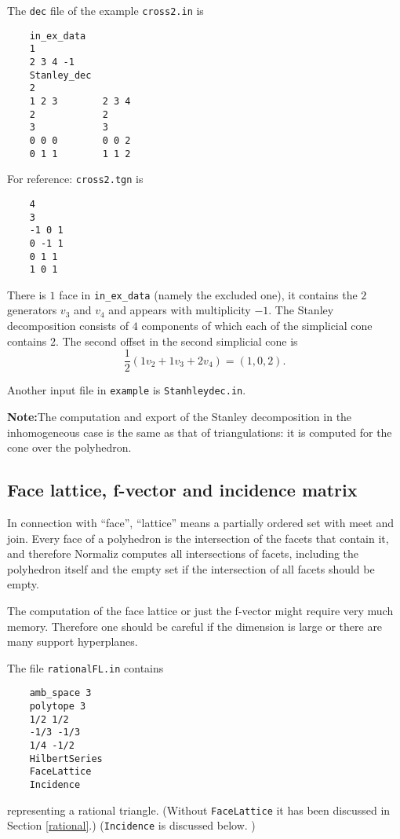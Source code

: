 \documentclass[12pt,a4paper]{scrartcl}
\theoremstyle{definition}
\begin{document}
{	
	The \verb|dec| file of the example \verb|cross2.in| is
	\begin{Verbatim}
	in_ex_data
	1
	2 3 4 -1
	Stanley_dec
	2
	1 2 3        2 3 4 
	2            2
	3            3
	0 0 0        0 0 2 
	0 1 1        1 1 2 
	\end{Verbatim}
	For reference: \verb|cross2.tgn| is
	\begin{Verbatim}
	4
	3
	-1 0 1 
	0 -1 1 
	0 1 1 
	1 0 1 
	\end{Verbatim}
	
	There is $1$ face in \verb|in_ex_data| (namely the excluded one), it contains the $2$ generators $v_3$ and $v_4$  and appears with multiplicity $-1$. The Stanley decomposition consists of $4$ components of which each of the simplicial cone contains $2$. The second offset in the second simplicial cone is
	$$
	\frac12 (1v_2+1v_3+2v_4)=(1,0,2).
	$$ 
	
	Another input file in \verb|example| is \verb|Stanhleydec.in|.
	
	\textbf{Note:}\enspace The computation and export of the Stanley decomposition in the inhomogeneous case is the same as that of triangulations: it is computed for the cone over the polyhedron.
	
	\subsection{Face lattice, f-vector and incidence matrix}\label{FaceLattice}
	
	In connection with ``face'', ``lattice'' means a partially ordered set with meet and join. Every face of a polyhedron is the intersection of the facets that contain it, and therefore Normaliz computes all intersections of facets, including the polyhedron itself and the empty set if the intersection of all facets should be empty.
	
	The computation of the face lattice or just the f-vector might require very much memory. Therefore one should be careful if the dimension is large or there are many support hyperplanes.
	
	The file \verb|rationalFL.in| contains
	\begin{Verbatim}
	amb_space 3
	polytope 3
	1/2 1/2
	-1/3 -1/3
	1/4 -1/2
	HilbertSeries
	FaceLattice
	Incidence
	\end{Verbatim}
	representing a rational triangle. (Without \verb|FaceLattice| it has been discussed in Section \ref{rational}.) (\verb|Incidence| is discussed below.
	)
	
}
\end{document}
